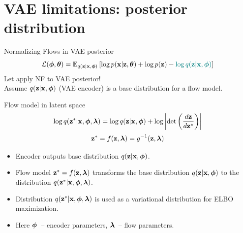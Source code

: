 \section{VAE limitations: posterior distribution}
\begin{frame}{Normalizing Flows in VAE posterior}
		\vspace{-0.3cm}
		\[
			\mathcal{L}(\boldsymbol{\phi}, \boldsymbol{\theta}) = \mathbb{E}_{q(\mathbf{z} | \mathbf{x}, \boldsymbol{\phi})} \left[ \log p(\mathbf{x} | \mathbf{z}, \boldsymbol{\theta}) + \log p(\mathbf{z}) - {\color{teal}\log q(\mathbf{z} | \mathbf{x}, \boldsymbol{\phi})} \right]
		\]
	Let apply NF to VAE posterior! \\ 
	Assume $q(\mathbf{z} | \mathbf{x}, \boldsymbol{\phi})$ (VAE encoder) is a base distribution for a flow model.
	\begin{block}{Flow model in latent space}
		\vspace{-0.5cm}
		\[
		\log q(\mathbf{z}^* | \mathbf{x}, \boldsymbol{\phi}, \boldsymbol{\lambda}) = \log q(\mathbf{z} | \mathbf{x}, \boldsymbol{\phi}) + \log \left | \det \left( \frac{d \mathbf{z}}{d \mathbf{z}^*}\right) \right|
		\]
		\vspace{-0.3cm}
		\[
		\mathbf{z}^* = f(\mathbf{z}, \boldsymbol{\lambda}) = g^{-1}(\mathbf{z}, \boldsymbol{\lambda})
		\]
		\vspace{-0.7cm}
	\end{block}
	\begin{itemize}
		\item Encoder outputs base distribution $q(\mathbf{z} | \mathbf{x}, \boldsymbol{\phi})$.
		\item Flow model $\mathbf{z}^* = f(\mathbf{z}, \boldsymbol{\lambda})$ transforms the base distribution $q(\mathbf{z} | \mathbf{x}, \boldsymbol{\phi})$ to the distribution $q(\mathbf{z}^* | \mathbf{x}, \boldsymbol{\phi}, \boldsymbol{\lambda})$.
		\item Distribution $q(\mathbf{z}^* | \mathbf{x}, \boldsymbol{\phi}, \boldsymbol{\lambda})$ is used as a variational distribution for ELBO maximization. 
		\item Here $\boldsymbol{\phi}$~-- encoder parameters, $\boldsymbol{\lambda}$~-- flow parameters.
	\end{itemize}
\end{frame}
